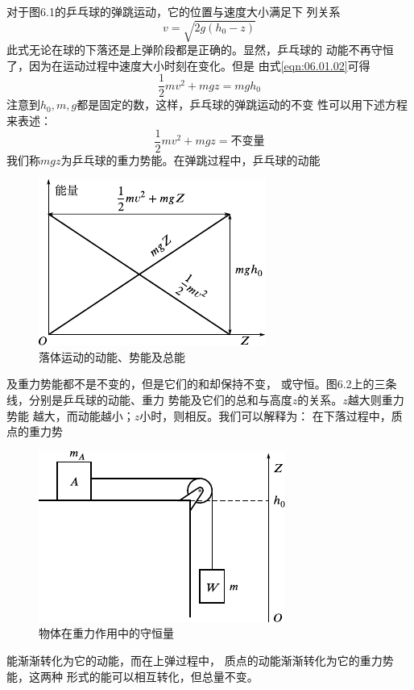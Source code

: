 对于图6.1的乒乓球的弹跳运动，它的位置与速度大小满足下
列关系
\begin{equation}\label{eqn:06.01.02}
  v = \sqrt { 2 g \left( h _ { 0 } - z \right) }
\end{equation}
此式无论在球的下落还是上弹阶段都是正确的。显然，乒乓球的
动能不再守恒了，因为在运动过程中速度大小时刻在变化。但是
由式\eqref{eqn:06.01.02}可得
\begin{equation}\label{eqn:06.01.03}
  \frac { 1 } { 2 } m v ^ { 2 } + m g z = m g h _ { 0 }
\end{equation}
注意到$ h _ { 0 } , m , g $都是固定的数，这样，乒乓球的弹跳运动的不变
性可以用下述方程来表述：
\begin{equation}\label{eqn:06.01.04}
  \frac { 1 } { 2 } m v ^ { 2 } + m g z = \text{不变量}
\end{equation}
我们称$ mgz $为乒乓球的重力势能。在弹跳过程中，乒乓球的动能
\begin{figure}
  \centering
  \includegraphics{figure/fig06.02}\vspace{0.6em}
  \caption{落体运动的动能、势能及总能}
  \label{fig:06.02}
\end{figure}
及重力势能都不是不变的，但是它们的和却保持不变，
或守恒。图6.2上的三条线，分别是乒乓球的动能、重力
势能及它们的总和与高度$ z $的关系。$ z $越大则重力势能
越大，而动能越小；$ z $小时，则相反。我们可以解释为：
在下落过程中，质点的重力势
\clearpage
\begin{figure}
  \vspace{1em}
  \centering
  \includegraphics{figure/fig06.03}\vspace{1em}
  \caption{物体在重力作用中的守恒量}
  \label{fig:06.03}
\end{figure}
\noindent 能渐渐转化为它的动能，而在上弹过程中，
质点的动能渐渐转化为它的重力势能，这两种
形式的能可以相互转化，但总量不变。

